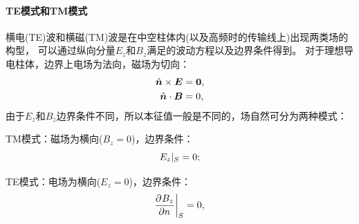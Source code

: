 \paragraph{TE模式和TM模式}
横电(TE)波和横磁(TM)波是在中空柱体内(以及高频时的传输线上)出现两类场的构型，
可以通过纵向分量$E_z$和$B_z$满足的波动方程以及边界条件得到。
对于理想导电柱体，边界上电场为法向，磁场为切向：
\begin{subequations}
    \begin{align}
        \mathop{}\!\hat{\bm{n}} \times \bm E &= \bm0,\\
        \mathop{}\!\hat{\bm{n}} \cdot \bm B &= 0,
    \end{align}
\end{subequations}
由于$E_z$和$B_z$边界条件不同，所以本征值一般是不同的，场自然可分为两种模式：
\begin{compactitem}
	\item TM模式：磁场为横向($B_z = 0$)，边界条件：
    \begin{equation}
        {E_z}\rvert_S = 0;
    \end{equation}
	\item TE模式：电场为横向($E_z = 0$)，边界条件：
    \begin{equation}
        {\frac{\partial^{}B_z}{\partial{n}^{}}}\biggr\rvert_S = 0,
    \end{equation}
\end{compactitem}
